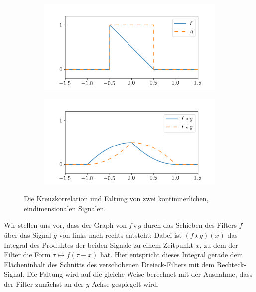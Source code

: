 \documentclass[paper=a4, 	%
		fontsize=11pt,
		abstract=true, 	%
		headsepline, 	%
		notitlepage	%
		]{scrartcl}
\theoremstyle{definition}
\begin{document}
\begin{figure}
    \begin{subfigure}[c]{0.5\textwidth}
        \includegraphics[width=\textwidth]{g.png}
    \end{subfigure}%
    \begin{subfigure}[c]{0.5\textwidth}
        \includegraphics[width=\textwidth]{corrs.png}
    \end{subfigure}
    \caption{
        Die Kreuzkorrelation und Faltung von zwei kontinuierlichen, eindimensionalen Signalen.
    }
    \label{fig:one-dim-cont-conv}
\end{figure}


Wir stellen uns vor, dass der Graph von $f \star g$ durch das Schieben des Filters $f$ über das Signal $g$ von links nach rechts entsteht:
Dabei ist $(f\star g)(x)$ das Integral des Produktes der beiden Signale zu einem Zeitpunkt $x$, zu dem der Filter die Form $\tau \mapsto f(\tau - x)$ hat.
Hier entspricht dieses Integral gerade dem Flächeninhalt des Schnitts des verschobenen Dreieck-Filters mit dem Rechteck-Signal.
Die Faltung wird auf die gleiche Weise berechnet mit der Ausnahme, dass der Filter zunächst an der $y$-Achse gespiegelt wird.

\medskip
\end{document}
